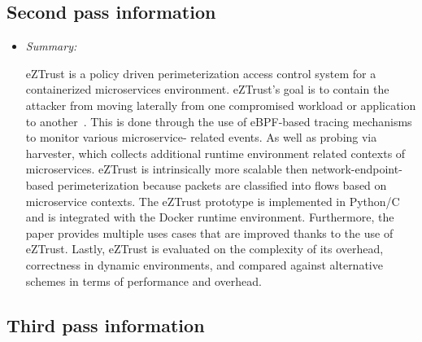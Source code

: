 \documentclass[letterpaper,twocolumn,10pt]{article}
\begin{document}
\subsection{Second pass information}
\label{sec:second}

\begin{itemize}

\item {\it Summary:} 

eZTrust is a policy driven perimeterization access control system for a containerized microservices environment. 
eZTrust's goal is to contain the attacker from moving laterally from one compromised workload or application to
another~\cite{ez}. This is done through the use of eBPF-based tracing mechanisms to monitor various microservice-
related events. As well as probing via harvester, which collects additional runtime environment related contexts of
microservices. eZTrust is intrinsically more scalable then network-endpoint-based perimeterization because packets
are classified into flows based on microservice contexts. The eZTrust prototype is implemented in Python/C and 
is integrated with the Docker runtime environment. Furthermore, the paper provides multiple uses cases that are 
improved thanks to the use of eZTrust. Lastly, eZTrust is evaluated on the complexity of its overhead, correctness 
in dynamic environments, and compared against alternative schemes in terms of performance and overhead.

\end{itemize}

\subsection{Third pass information}
\label{sec:third}
\end{document}
